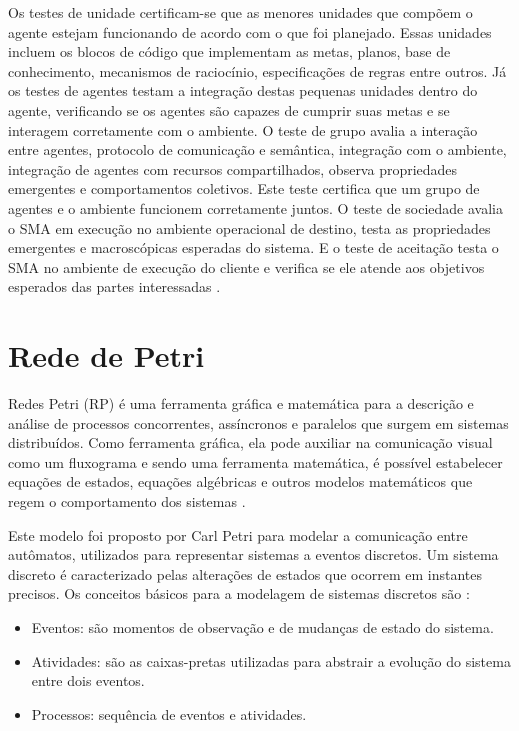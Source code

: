 Os testes de unidade certificam-se que as menores unidades que compõem o agente estejam funcionando de acordo com o que foi planejado. Essas unidades incluem os blocos de código que implementam as metas, planos, base de conhecimento, mecanismos de raciocínio, especificações de regras entre outros. Já os testes de agentes testam a integração destas pequenas unidades  dentro do agente, verificando se os agentes são capazes de cumprir suas metas e se interagem corretamente com o ambiente. O teste de grupo avalia a interação entre agentes, protocolo de comunicação e semântica, integração com o ambiente, integração de agentes com recursos compartilhados, observa propriedades emergentes e comportamentos coletivos. Este teste certifica que um grupo de agentes e o ambiente funcionem corretamente juntos. O teste de sociedade avalia o SMA em execução no ambiente operacional de destino, testa as propriedades emergentes e macroscópicas esperadas do sistema. E o teste de aceitação testa o SMA no ambiente de execução do cliente e verifica se ele atende aos objetivos esperados das partes interessadas \cite{nguyen2009thesis}.

\section{Rede de Petri}

 Redes Petri (RP) é uma ferramenta gráfica e matemática para a descrição e análise de processos concorrentes, assíncronos e paralelos que surgem em sistemas distribuídos. Como ferramenta gráfica, ela pode auxiliar na comunicação visual como um fluxograma e sendo uma ferramenta matemática, é possível estabelecer equações de estados, equações algébricas e outros modelos matemáticos que regem o comportamento dos sistemas \citep{murata1989petri}. 

Este modelo foi proposto por Carl Petri para modelar a comunicação entre autômatos, utilizados para representar sistemas a eventos discretos. Um sistema discreto é caracterizado pelas alterações de estados que ocorrem em instantes precisos. Os conceitos básicos para a modelagem de sistemas discretos são \cite{cardoso1997redes}:

\begin{itemize}
\item Eventos: são momentos de observação e de mudanças de estado do sistema.
\item Atividades: são as caixas-pretas utilizadas para abstrair a evolução do sistema entre dois eventos.
\item Processos: sequência de eventos e atividades.
\end{itemize}

